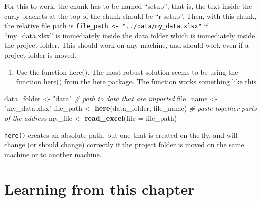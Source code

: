 \documentclass[]{book}
\newenvironment{Shaded}{\begin{snugshade}}{\end{snugshade}}
\newcommand{\CommentTok}[1]{\textcolor[rgb]{0.56,0.35,0.01}{\textit{#1}}}
\newcommand{\DataTypeTok}[1]{\textcolor[rgb]{0.13,0.29,0.53}{#1}}
\newcommand{\KeywordTok}[1]{\textcolor[rgb]{0.13,0.29,0.53}{\textbf{#1}}}
\newcommand{\NormalTok}[1]{#1}
\newcommand{\OperatorTok}[1]{\textcolor[rgb]{0.81,0.36,0.00}{\textbf{#1}}}
\newcommand{\StringTok}[1]{\textcolor[rgb]{0.31,0.60,0.02}{#1}}
\providecommand{\tightlist}{%
  \setlength{\itemsep}{0pt}\setlength{\parskip}{0pt}}
\begin{document}
\begin{Shaded}
\end{Shaded}

For this to work, the chunk has to be named ``setup'', that is, the text inside the curly brackets at the top of the chunk should be ``r setup''. Then, with this chunk, the relative file path is \texttt{file\_path\ \textless{}-\ "../data/my\_data.xlsx"} if ``my\_data.xlsx'' is immediately inside the data folder which is immediately inside the project folder. This should work on any machine, and should work even if a project folder is moved.

\begin{enumerate}
\def\labelenumi{\arabic{enumi}.}
\setcounter{enumi}{2}
\tightlist
\item
  Use the function here(). The most robust solution seems to be using the function here() from the here package. The function works something like this
\end{enumerate}

\begin{Shaded}
\begin{Highlighting}[]
\NormalTok{data_folder <-}\StringTok{ "data"} \CommentTok{# path to data that are imported}
\NormalTok{file_name <-}\StringTok{ "my_data.xlsx"}
\NormalTok{file_path <-}\StringTok{ }\KeywordTok{here}\NormalTok{(data_folder, file_name) }\CommentTok{# paste together parts of the address}
\NormalTok{my_file <-}\StringTok{ }\KeywordTok{read_excel}\NormalTok{(}\DataTypeTok{file =}\NormalTok{ file_path)}
\end{Highlighting}
\end{Shaded}

\texttt{here()} creates an absolute path, but one that is created on the fly, and will change (or should change) correctly if the project folder is moved on the same machine or to another machine.

\hypertarget{learning-from-this-chapter}{%
\section{Learning from this chapter}\label{learning-from-this-chapter}}
\end{document}
